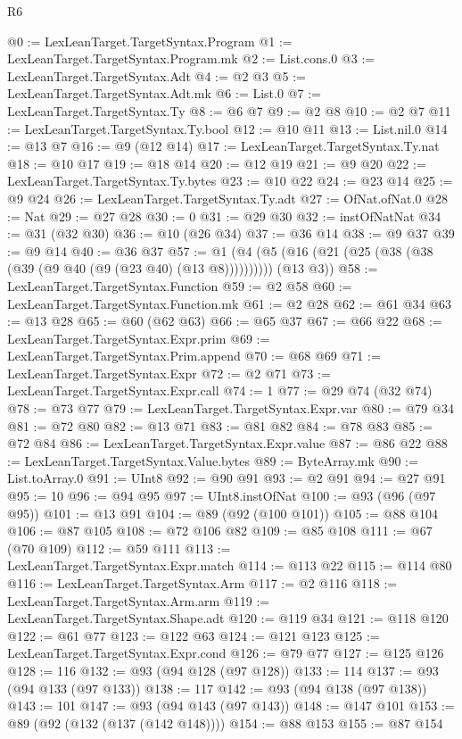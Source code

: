 \begin{lexlean}{R6}
\begin{coremodule}
@0 := LexLeanTarget.TargetSyntax.Program
@1 := LexLeanTarget.TargetSyntax.Program.mk
@2 := List.cons.{0}
@3 := LexLeanTarget.TargetSyntax.Adt
@4 := @2 @3
@5 := LexLeanTarget.TargetSyntax.Adt.mk
@6 := List.{0}
@7 := LexLeanTarget.TargetSyntax.Ty
@8 := @6 @7
@9 := @2 @8
@10 := @2 @7
@11 := LexLeanTarget.TargetSyntax.Ty.bool
@12 := @10 @11
@13 := List.nil.{0}
@14 := @13 @7
@16 := @9 (@12 @14)
@17 := LexLeanTarget.TargetSyntax.Ty.nat
@18 := @10 @17
@19 := @18 @14
@20 := @12 @19
@21 := @9 @20
@22 := LexLeanTarget.TargetSyntax.Ty.bytes
@23 := @10 @22
@24 := @23 @14
@25 := @9 @24
@26 := LexLeanTarget.TargetSyntax.Ty.adt
@27 := OfNat.ofNat.{0}
@28 := Nat
@29 := @27 @28
@30 := 0
@31 := @29 @30
@32 := instOfNatNat
@34 := @31 (@32 @30)
@36 := @10 (@26 @34)
@37 := @36 @14
@38 := @9 @37
@39 := @9 @14
@40 := @36 @37
@57 := @1 (@4 (@5 (@16 (@21 (@25 (@38 (@38 (@39 (@9 @40 (@9 (@23 @40) (@13 @8)))))))))) (@13 @3))
@58 := LexLeanTarget.TargetSyntax.Function
@59 := @2 @58
@60 := LexLeanTarget.TargetSyntax.Function.mk
@61 := @2 @28
@62 := @61 @34
@63 := @13 @28
@65 := @60 (@62 @63)
@66 := @65 @37
@67 := @66 @22
@68 := LexLeanTarget.TargetSyntax.Expr.prim
@69 := LexLeanTarget.TargetSyntax.Prim.append
@70 := @68 @69
@71 := LexLeanTarget.TargetSyntax.Expr
@72 := @2 @71
@73 := LexLeanTarget.TargetSyntax.Expr.call
@74 := 1
@77 := @29 @74 (@32 @74)
@78 := @73 @77
@79 := LexLeanTarget.TargetSyntax.Expr.var
@80 := @79 @34
@81 := @72 @80
@82 := @13 @71
@83 := @81 @82
@84 := @78 @83
@85 := @72 @84
@86 := LexLeanTarget.TargetSyntax.Expr.value
@87 := @86 @22
@88 := LexLeanTarget.TargetSyntax.Value.bytes
@89 := ByteArray.mk
@90 := List.toArray.{0}
@91 := UInt8
@92 := @90 @91
@93 := @2 @91
@94 := @27 @91
@95 := 10
@96 := @94 @95
@97 := UInt8.instOfNat
@100 := @93 (@96 (@97 @95))
@101 := @13 @91
@104 := @89 (@92 (@100 @101))
@105 := @88 @104
@106 := @87 @105
@108 := @72 @106 @82
@109 := @85 @108
@111 := @67 (@70 @109)
@112 := @59 @111
@113 := LexLeanTarget.TargetSyntax.Expr.match
@114 := @113 @22
@115 := @114 @80
@116 := LexLeanTarget.TargetSyntax.Arm
@117 := @2 @116
@118 := LexLeanTarget.TargetSyntax.Arm.arm
@119 := LexLeanTarget.TargetSyntax.Shape.adt
@120 := @119 @34
@121 := @118 @120
@122 := @61 @77
@123 := @122 @63
@124 := @121 @123
@125 := LexLeanTarget.TargetSyntax.Expr.cond
@126 := @79 @77
@127 := @125 @126
@128 := 116
@132 := @93 (@94 @128 (@97 @128))
@133 := 114
@137 := @93 (@94 @133 (@97 @133))
@138 := 117
@142 := @93 (@94 @138 (@97 @138))
@143 := 101
@147 := @93 (@94 @143 (@97 @143))
@148 := @147 @101
@153 := @89 (@92 (@132 (@137 (@142 @148))))
@154 := @88 @153
@155 := @87 @154

\end{coremodule}
\end{lexlean}
